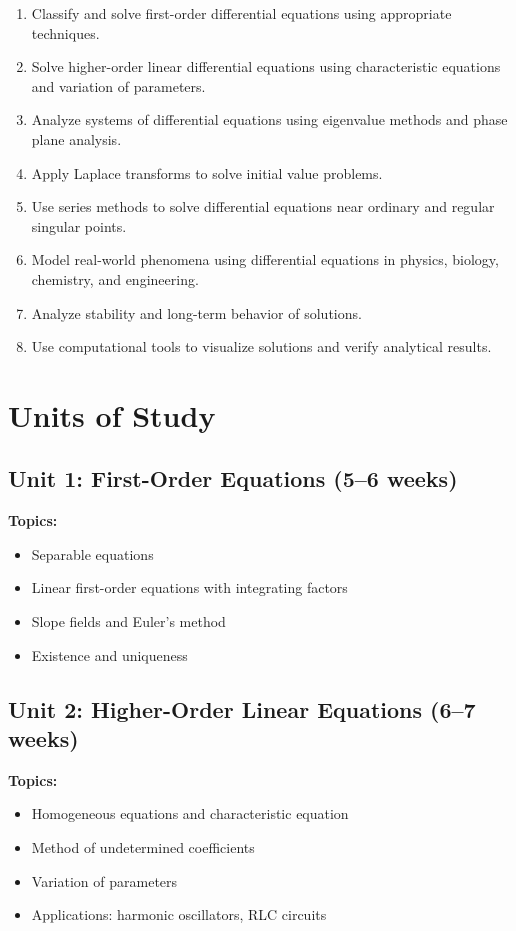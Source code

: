 \documentclass[12pt,oneside]{book}
\begin{document}
\begin{enumerate}
    \item Classify and solve first-order differential equations using appropriate techniques.
    \item Solve higher-order linear differential equations using characteristic equations and variation of parameters.
    \item Analyze systems of differential equations using eigenvalue methods and phase plane analysis.
    \item Apply Laplace transforms to solve initial value problems.
    \item Use series methods to solve differential equations near ordinary and regular singular points.
    \item Model real-world phenomena using differential equations in physics, biology, chemistry, and engineering.
    \item Analyze stability and long-term behavior of solutions.
    \item Use computational tools to visualize solutions and verify analytical results.
\end{enumerate}


\section{Units of Study}

\subsection{Unit 1: First-Order Equations (5--6 weeks)}

\textbf{Topics:}
\begin{itemize}
    \item Separable equations
    \item Linear first-order equations with integrating factors
    \item Slope fields and Euler's method
    \item Existence and uniqueness
\end{itemize}

\subsection{Unit 2: Higher-Order Linear Equations (6--7 weeks)}

\textbf{Topics:}
\begin{itemize}
    \item Homogeneous equations and characteristic equation
    \item Method of undetermined coefficients
    \item Variation of parameters
    \item Applications: harmonic oscillators, RLC circuits
\end{itemize}
\end{document}
